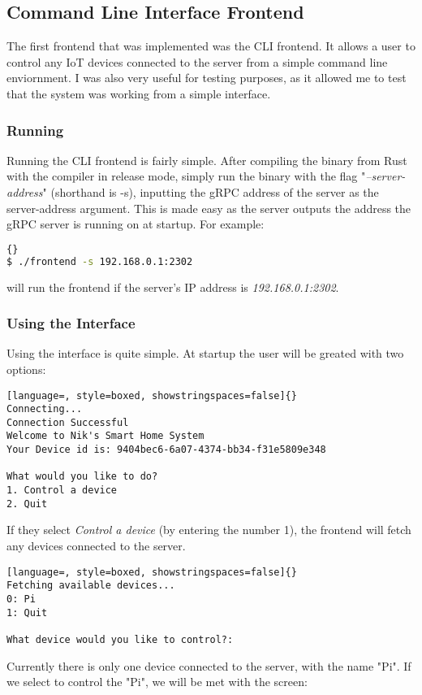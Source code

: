 \subsection{Command Line Interface Frontend} \label{sec:chapimpl:cli}
The first frontend that was implemented was the CLI frontend. It allows a user to control any IoT devices connected to the server from a simple command line enviornment. I was also very useful for testing purposes, as it allowed me to test that the system was working from a simple interface.
\subsubsection{Running}
Running the CLI frontend is fairly simple. After compiling the binary from Rust with the compiler in release mode, simply run the binary with the flag "\textit{--server-address}" (shorthand is -s), inputting the gRPC address of the server as the server-address argument. This is made easy as the server outputs the address the gRPC server is running on at startup. For example:
\begin{lstlisting}[language=Bash, style=boxed, showstringspaces=false]{}
$ ./frontend -s 192.168.0.1:2302
\end{lstlisting}
will run the frontend if the server's IP address is \textit{192.168.0.1:2302}.

\subsubsection{Using the Interface}
Using the interface is quite simple. At startup the user will be greated with two options:
\begin{lstlisting}[language=, style=boxed, showstringspaces=false]{}
Connecting...
Connection Successful
Welcome to Nik's Smart Home System
Your Device id is: 9404bec6-6a07-4374-bb34-f31e5809e348

What would you like to do?
1. Control a device
2. Quit
\end{lstlisting}
If they select \textit{Control a device} (by entering the number 1), the frontend will fetch any devices connected to the server.
\begin{lstlisting}[language=, style=boxed, showstringspaces=false]{}
Fetching available devices...
0: Pi
1: Quit

What device would you like to control?:
\end{lstlisting}
Currently there is only one device connected to the server, with the name "Pi". If we select to control the "Pi", we will be met with the screen:

